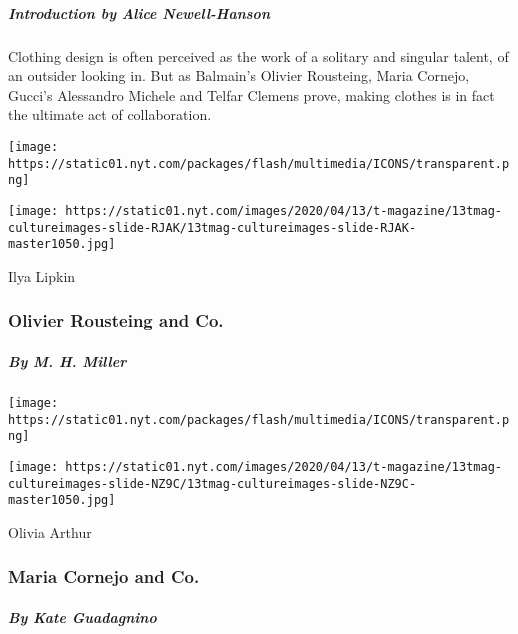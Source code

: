 \hypertarget{introduction-by-alice-newell-hanson}{%
\subparagraph{Introduction by Alice
Newell-Hanson}\label{introduction-by-alice-newell-hanson}}

Clothing design is often perceived as the work of a solitary and
singular talent, of an outsider looking in. But as Balmain's Olivier
Rousteing, Maria Cornejo, Gucci's Alessandro Michele and Telfar Clemens
prove, making clothes is in fact the ultimate act of collaboration.

\href{https://www.nytimes.com/interactive/2020/04/13/t-magazine/maria-cornejo-olivier-rousteing-telfar-clemens-alessandro-michele.html\#olivier-rousteing-and-co}{}

\texttt{[image: https://static01.nyt.com/packages/flash/multimedia/ICONS/transparent.png]}

\texttt{[image: https://static01.nyt.com/images/2020/04/13/t-magazine/13tmag-cultureimages-slide-RJAK/13tmag-cultureimages-slide-RJAK-master1050.jpg]}

Ilya Lipkin

\hypertarget{olivier-rousteing-and-co}{%
\subsubsection{Olivier Rousteing and
Co.}\label{olivier-rousteing-and-co}}

\hypertarget{by-m-h-miller-1}{%
\subparagraph{By M. H. Miller}\label{by-m-h-miller-1}}

\href{https://www.nytimes.com/interactive/2020/04/13/t-magazine/maria-cornejo-olivier-rousteing-telfar-clemens-alessandro-michele.html\#maria-cornejo-and-co}{}

\texttt{[image: https://static01.nyt.com/packages/flash/multimedia/ICONS/transparent.png]}

\texttt{[image: https://static01.nyt.com/images/2020/04/13/t-magazine/13tmag-cultureimages-slide-NZ9C/13tmag-cultureimages-slide-NZ9C-master1050.jpg]}

Olivia Arthur

\hypertarget{maria-cornejo-and-co}{%
\subsubsection{Maria Cornejo and Co.}\label{maria-cornejo-and-co}}

\hypertarget{by-kate-guadagnino}{%
\subparagraph{By Kate Guadagnino}\label{by-kate-guadagnino}}

\href{https://www.nytimes.com/interactive/2020/04/13/t-magazine/maria-cornejo-olivier-rousteing-telfar-clemens-alessandro-michele.html\#telfar-clemens-and-co}{}

